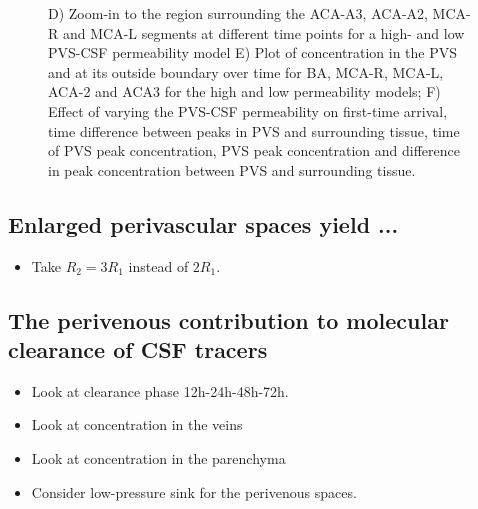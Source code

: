 \documentclass[fleqn,10pt]{wlscirep}
\newcommand{\mer}[1]{\textcolor{magenta}{#1}}
\begin{document}
\begin{figure}
{    D) Zoom-in to the region surrounding the ACA-A3, ACA-A2, MCA-R and MCA-L segments at different time points for a high- and low PVS-CSF permeability model
    E) Plot of concentration in the PVS and at its outside boundary over time for BA, MCA-R, MCA-L, ACA-2 and ACA3 for the high and low permeability models;
    F) Effect of varying the PVS-CSF permeability on first-time arrival, time difference between peaks in PVS and surrounding tissue, time of PVS peak concentration, PVS peak concentration and difference in peak concentration between PVS and surrounding tissue.}
    \label{fig:compartmentalization}
\end{figure}

\subsection*{Enlarged perivascular spaces yield ...}

\begin{itemize}
  \item Take $R_2 = 3 R_1$ instead of $2 R_1$.
\end{itemize}

\subsection*{The perivenous contribution to molecular clearance of CSF tracers}

\begin{itemize}
\item
  Look at clearance phase 12h-24h-48h-72h.
\item
  Look at concentration in the veins
\item
  Look at concentration in the parenchyma
\item
  Consider low-pressure sink for the perivenous spaces.
\end{itemize}


\end{document}
